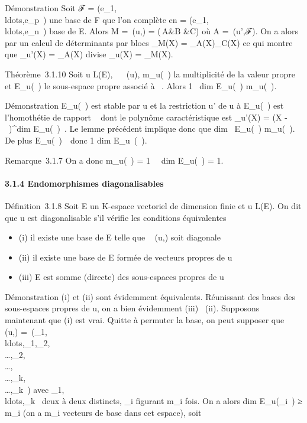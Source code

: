 \documentclass[]{article}
\begin{document}
Démonstration Soit ℱ =
(e_1,\\ldots,e_p~)
une base de F que l'on complète en  =
(e_1,\\ldots,e_n~)
base de E. Alors M =\
\mathrmMat (u,) = \left
(\matrix\,A&B
&C\right ) où A =\
\mathrmMat (u',ℱ). On a alors par un calcul de
déterminants par blocs \chi_M(X) = \chi_A(X)\chi_C(X)
ce qui montre que \chi_u'(X) = \chi_A(X) divise
\chi_u(X) = \chi_M(X).

Théorème~3.1.10 Soit u \in L(E), \lambda~
\in{}~(u),
m_u(\lambda~) la multiplicité de la valeur propre \lambda~ et E_u(\lambda~)
le sous-espace propre associé à \lambda~. Alors 1 \leq\
dim E_u(\lambda~) \leq m_u(\lambda~).

Démonstration E_u(\lambda~) est stable par u et la restriction u' de u
à E_u(\lambda~) est l'homothétie de rapport \lambda~ dont le polynôme
caractéristique est \chi_u'(X) = (X -
\lambda~)^dim E_u(\lambda~)~. Le lemme
précédent implique donc que dim~
E_u(\lambda~) \leq m_u(\lambda~). De plus
E_u(\lambda~)\neq~\0\,
donc 1 \leq dim E_u~(\lambda~).

Remarque~3.1.7 On a donc m_u(\lambda~) = 1 \rigtharrow~\
dim E_u(\lambda~) = 1.

\paragraph{3.1.4 Endomorphismes diagonalisables}

Définition~3.1.8 Soit E un K-espace vectoriel de dimension finie et u \in
L(E). On dit que u est diagonalisable s'il vérifie les conditions
équivalentes

\begin{itemize}
\itemsep1pt\parskip0pt\parsep0pt
\item
  (i) il existe une base  de E telle que
  \mathrmMat~ (u,) soit
  diagonale
\item
  (ii) il existe une base \mathcal{E} de E formée de vecteurs propres de u
\item
  (iii) E est somme (directe) des sous-espaces propres de u
\end{itemize}

Démonstration (i) et (ii) sont évidemment équivalents. Réunissant des
bases des sous-espaces propres de u, on a bien évidemment (iii) \rigtharrow~(ii).
Supposons maintenant que (i) est vrai. Quitte à permuter la base, on
peut supposer que
\mathrmMat~ (u,\mathcal{E})
=\
\mathrmdiag(\lambda_1,\\ldots,\lambda_1,\lambda_2,\\\ldots,\lambda_2,\\\ldots,\\\ldots,\lambda_k,\\\ldots,\lambda_k~)
avec
\lambda_1,\\ldots,\lambda_k~
deux à deux distincts, \lambda_i figurant m_i fois. On a
alors dim E_u(\lambda_i~) ≥
m_i (on a m_i vecteurs de base dans cet espace), soit
\end{document}
